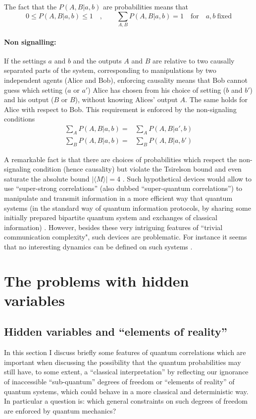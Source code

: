 The fact that the $P(A,B|a,b)$ are probabilities means that
\begin{equation}
\label{ }
0\le P(A,B|a,b)\le 1\quad,\qquad \sum_{A,B}P(A,B|a,b)=1\quad\text{for}\quad a,b\ \text{fixed}
\end{equation}
\paragraph{Non signalling:} 
If the settings $a$ and $b$ and the outputs $A$ and $B$ are relative to two causally separated parts of the system, corresponding to manipulations by two independent agents (Alice and Bob), enforcing causality means that Bob cannot guess which setting ($a$ or $a'$) Alice has chosen from his choice of setting ($b$ and $b'$) and his output ($B$ or $B$), without knowing Alices' output $A$. The same holds for Alice with respect to Bob.
This requirement is enforced by the non-signaling conditions
\begin{align}
\label{}
    \sum_A P(A,B|a,b) = &  \sum_A P(A,B|a',b) \\
    \sum_B P(A,B|a,b) = &  \sum_B P(A,B|a,b')  
\end{align}

A remarkable fact is that there are choices of probabilities which respect the non-signaling condition (hence causality) but violate the Tsirelson  bound and even saturate the absolute bound $|\langle M\rangle|=4$ .
Such hypothetical devices  would allow to use ``super-strong correlations'' (also dubbed ``super-quantum correlations'') to manipulate and transmit information in a more efficient way that quantum systems (in the standard way of quantum information protocols, by sharing some initially prepared bipartite quantum system and exchanges of classical information) 
\cite{PhysRevLett.96.250401}
\cite{vanDam2005}
\cite{10.1038/nature08400}
.  However, besides these very intriguing features of ``trivial communication complexity", such devices are problematic. 
For instance it seems that no interesting dynamics can be defined on such systems  \cite{PhysRevLett.104.080402}.


\section{The problems with hidden variables}
\label{sHidVar}
\subsection{Hidden variables and ``elements of reality''}
In this section I discuss briefly some features of quantum correlations which are important when discussing the possibility that the quantum probabilities may still have, to some extent, a ``classical interpretation'' by reflecting our ignorance of inaccessible ``sub-quantum'' degrees of freedom or ``elements of reality'' of quantum systems, which could behave in a more classical and deterministic way. In particular a question is: which general  constraints on such degrees of freedom are enforced by quantum mechanics?

